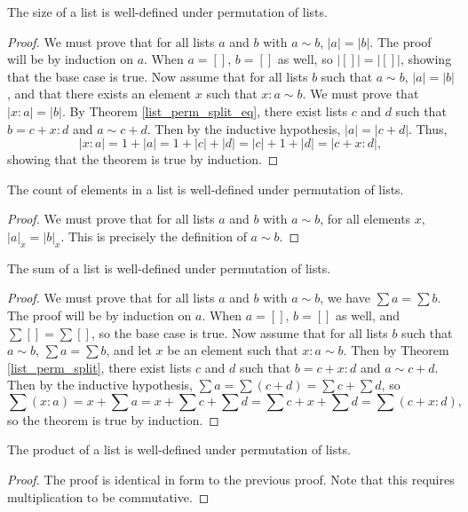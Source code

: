 \documentclass[../../math.tex]{subfiles}
\begin{document}
\begin{lemma}
    The size of a list is well-defined under permutation of lists.
\end{lemma}
\begin{proof}
    We must prove that for all lists $a$ and $b$ with $a \sim b$, $|a| = |b|$.
    The proof will be by induction on $a$.  When $a = []$, $b = []$ as well, so
    $|[]| = |[]|$, showing that the base case is true.  Now assume that for all
    lists $b$ such that $a \sim b$, $|a| = |b|$, and that there exists an
    element $x$ such that $x : a \sim b$.  We must prove that $|x : a| = |b|$.
    By Theorem \ref{list_perm_split_eq}, there exist lists $c$ and $d$ such that
    $b = c + x : d$ and $a \sim c + d$.  Then by the inductive hypothesis, $|a|
    = |c + d|$.  Thus,
    \[
        |x : a| = 1 + |a| = 1 + |c| + |d| = |c| + 1 + |d| = |c + x : d|,
    \]
    showing that the theorem is true by induction.
\end{proof}

\begin{lemma}
    The count of elements in a list is well-defined under permutation of lists.
\end{lemma}
\begin{proof}
    We must prove that for all lists $a$ and $b$ with $a \sim b$, for all
    elements $x$, $|a|_x = |b|_x$.  This is precisely the definition of $a \sim
    b$.
\end{proof}

\begin{lemma}
    The sum of a list is well-defined under permutation of lists.
\end{lemma}
\begin{proof}
    We must prove that for all lists $a$ and $b$ with $a \sim b$, we have $\sum
    a = \sum b$.  The proof will be by induction on $a$.  When $a = []$, $b =
    []$ as well, and $\sum [] = \sum []$, so the base case is true.  Now assume
    that for all lists $b$ such that $a \sim b$, $\sum a = \sum b$, and let $x$
    be an element such that $x : a \sim b$.  Then by Theorem
    \ref{list_perm_split}, there exist lists $c$ and $d$ such that $b = c + x :
    d$ and $a \sim c + d$.  Then by the inductive hypothesis, $\sum a = \sum (c
    + d) = \sum c + \sum d$, so
    \[
        \sum (x : a) = x + \sum a = x + \sum c + \sum d = \sum c + x + \sum d
        = \sum (c + x : d),
    \]
    so the theorem is true by induction.
\end{proof}

\begin{lemma}
    The product of a list is well-defined under permutation of lists.
\end{lemma}
\begin{proof}
    The proof is identical in form to the previous proof.  Note that this
    requires multiplication to be commutative.
\end{proof}
\end{document}
